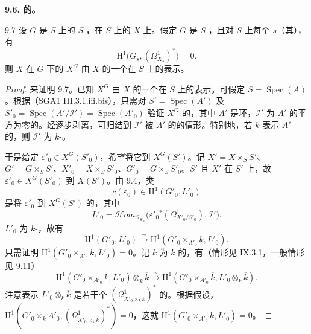 \textbf{9.6. 的。}
\begin{SGAresult}{}{9.7}
设 $G$ 是 $S$ 上的 $S$-，在 $S$ 上的 $X$ 上。假定 $G$ 是 $S$-，且对 $S$ 上每个 $s$（其），有
\[
\mathrm H^1\bigl(G_s,(\Omega^1_{X_s})^*\bigr)=0.
\]
则 $X$ 在 $G$ 下的 $X^G$ 由 $X$ 的一个在 $S$ 上的表示。
\end{SGAresult}
\begin{proof}
来证明 9.7。已知 $X^G$ 由 $X$ 的一个在 $S$ 上的表示。可假定 $S=\operatorname{Spec}(A)$ 。根据（SGA1 III.3.1.iii.bis），只需对 $S'=\operatorname{Spec}(A')$ 及
$S'_0=\operatorname{Spec}(A'/\mathcal I')=\operatorname{Spec}(A'_0)$ 验证 $X^G$ 的，其中 $A'$ 是环，$\mathcal I'$ 为 $A'$ 的平方为零的。经逐步剥离，可归结到 $\mathcal I'$ 被 $A'$ 的的情形。特别地，若 $k$ 表示 $A'$ 的，则 $\mathcal I'$ 为 $k$-。

于是给定 $\varepsilon'_0\in X^G(S'_0)$，希望将它到 $X^G(S')$。记 $X'=X\times_SS'$、$G'=G\times_SS'$、$X'_0=X\times_SS'_0$、$G'_0=G\times_SS'_0$。$S'$ 且 $X'$ 在 $S'$ 上，故 $\varepsilon'_0\in X^G(S'_0)$ 到 $X(S')$。由 9.4，类
\[
c(\varepsilon_0)\in\mathrm H^1(G'_0,L'_0)
\]
是将 $\varepsilon'_0$ 到 $X^G(S')$ 的，其中
\[
L'_0=\mathcal H\!om_{\mathcal O_{S'_0}}\bigl(\varepsilon'_0{}^*(\Omega^1_{X'_0/S'_0}),\mathcal I'\bigr).
\]
$L'_0$ 为 $k$-，故有
\[
\mathrm H^1(G'_0,L'_0)\xrightarrow{\sim}\mathrm H^1(G'_0\times_{A'_0}k,L'_0).
\]
只需证明 $\mathrm H^1(G'_0\times_{A'_0}k,L'_0)=0$。记 $\overline k$ 为 $k$ 的，有（情形见 IX.3.1，一般情形见 9.11）
\[
\mathrm H^1(G'_0\times_{A'_0}k,L'_0)\otimes_k\overline k
\xrightarrow{\sim}\mathrm H^1(G'_0\times_{A'_0}\overline k,L'_0\otimes_k\overline k).
\]
注意表示 $L'_0\otimes_k\overline k$ 是若干个 $(\Omega^1_{X'_0\times_k\overline k})^*$ 的。根据假设，$\mathrm H^1(G'_0\times_kA'_0,(\Omega^1_{X'_0\times_k\overline k})^*)=0$，这就 $\mathrm H^1(G'_0\times_{A'_0}k,L'_0)=0$。
\end{proof}
